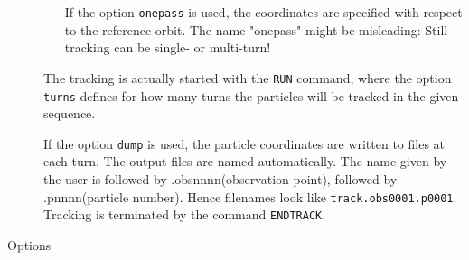 \begin{description}
\begin{itemize}
            If the option \texttt{onepass} is used, the coordinates are specified with respect 
            to the reference orbit. The name "onepass" might be misleading: Still tracking can be single- or multi-turn!  
            
          \end{itemize}
          The tracking is actually started with the \texttt{RUN} command, where the option 
          \texttt{turns} defines for how many turns the particles will be tracked in the 
          given sequence.
          
          If the option \texttt{dump} is used, the particle coordinates are written
          to files at each turn. The output files are named automatically. The name given by the user is followed 
          by .obsnnnn(observation point), followed by .pnnnn(particle number). Hence filenames look like           
          \texttt{track.obs0001.p0001}. 
          \\
          Tracking is terminated by the command \texttt{ENDTRACK}.
          
	\item[Options] 
	  \text{ \\}	
	  

\end{description}
